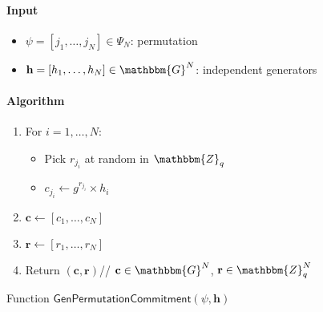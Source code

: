 \documentclass[a4paper]{article}
\newcommand{\G}{\mathbbm{G}}
\newcommand{\Z}{\mathbbm{Z}}
\begin{document}
\begin{table}
  \begin{framed}
    \noindent\paragraph{Input}
    \begin{itemize}
    \item $\psi=[j_1,\dots,j_N]\in\Psi_N$: permutation
    \item $\textbf{h}=[h_1,\dots,h_N]\in\G^N$: independent generators
    \end{itemize}
    \noindent\paragraph{Algorithm}
    \begin{enumerate}
    \item For $i=1,\dots,N$:
      \begin{itemize}
      \item Pick $r_{j_i}$ at random in $\Z_q$
      \item $c_{j_i}\leftarrow g^{r_{j_i}}\times h_i$
      \end{itemize}
    \item $\textbf{c}\leftarrow[c_1,\dots,c_N]$
    \item $\textbf{r}\leftarrow[r_1,\dots,r_N]$
    \item Return $(\textbf{c},\textbf{r})$\hfill//
      $\textbf{c}\in\G^N$, $\textbf{r}\in\Z_q^N$
    \end{enumerate}
  \end{framed}
  \caption{Function $\mathsf{GenPermutationCommitment}(\psi,\textbf{h})$}
  \label{gen-permutation-commitment}
\end{table}
\end{document}
